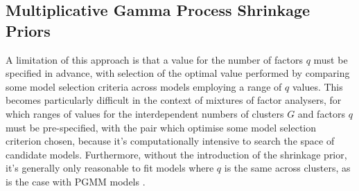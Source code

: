 \documentclass[a4paper,12pt,fleqn]{article}
\numberwithin{equation}{section}
\begin{document}
\subsection[Multiplicative Gamma Process Shrinkage Priors]{Multiplicative Gamma Process Shrinkage Priors}
\label{MGP} A limitation of this approach is that a value for the number of factors $q$ must be specified in advance, with selection of the optimal value performed by comparing some model selection criteria across models employing a range of $q$ values. This becomes particularly difficult in the context of mixtures of factor analysers, for which ranges of values for the interdependent numbers of clusters $G$ and factors $q$ must be pre-specified, with the pair which optimise some model selection criterion chosen, because it's computationally intensive to search the space of candidate models. Furthermore, without the introduction of the shrinkage prior, it's generally only reasonable to fit models where $q$ is the same across clusters, as is the case with PGMM models \citep{McNicholas2008, Ghahramani1996}.
\end{document}
